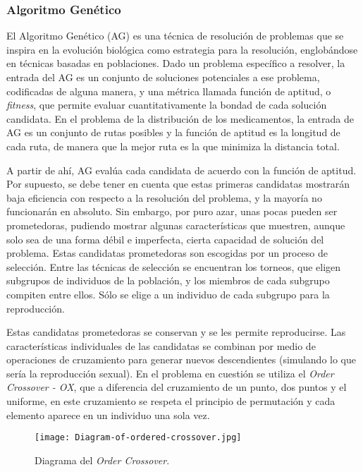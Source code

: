 \documentclass[twocolumn, fontsize=10pt]{article}
\begin{document}
\subsubsection{Algoritmo Genético}

El Algoritmo Genético (AG) es una técnica de resolución de problemas que se inspira en la evolución biológica como estrategia para la resolución, englobándose en técnicas basadas en poblaciones. Dado un problema específico a resolver, la entrada del AG es un conjunto de soluciones potenciales a ese problema, codificadas de alguna manera, y una métrica llamada función de aptitud, o \textit{fitness}, que permite evaluar cuantitativamente la bondad de cada solución candidata. En el problema de la distribución de los medicamentos, la entrada de AG es un conjunto de rutas posibles y la función de aptitud es la longitud de cada ruta, de manera que la mejor ruta es la que minimiza la distancia total.  

A partir de ahí, AG evalúa cada candidata de acuerdo con la función de aptitud. Por supuesto, se debe tener en cuenta que estas primeras candidatas mostrarán baja eficiencia con respecto a la resolución del problema, y la mayoría no funcionarán en absoluto. Sin embargo, por puro azar, unas pocas pueden ser prometedoras, pudiendo mostrar algunas características que muestren, aunque solo sea de una forma débil e imperfecta, cierta capacidad de solución del problema. Estas candidatas prometedoras son escogidas por un proceso de selección. Entre las técnicas de selección se encuentran los torneos, que eligen subgrupos de individuos de la población, y los miembros de cada subgrupo compiten entre ellos. Sólo se elige a un individuo de cada subgrupo para la reproducción.  

Estas candidatas prometedoras se conservan y se les permite reproducirse. Las características individuales de las candidatas se combinan por medio de operaciones de cruzamiento para generar nuevos descendientes (simulando lo que sería la reproducción sexual). En el problema en cuestión se utiliza el \textit{Order Crossover - OX}, que a diferencia del cruzamiento de un punto, dos puntos y el uniforme, en este cruzamiento se respeta el principio de permutación y cada elemento aparece en un individuo una sola vez.

\begin{figure}[h]
    \centering
    \texttt{[image: Diagram-of-ordered-crossover.jpg]}
    \caption{Diagrama del \textit{Order Crossover}.}
    \label{fig:gadget}
\end{figure}
\end{document}
